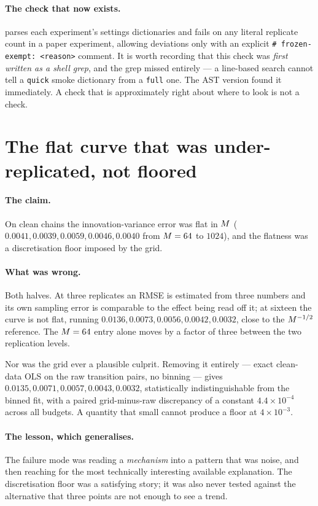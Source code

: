 \paragraph{The check that now exists.}  parses each
experiment's settings dictionaries and fails on any literal replicate count in a paper
experiment, allowing deviations only with an explicit \texttt{\# frozen-exempt: <reason>}
comment. It is worth recording that this check was \emph{first written as a shell grep}, and the
grep missed  entirely --- a line-based search cannot tell a \texttt{quick} smoke
dictionary from a \texttt{full} one. The AST version found it immediately. A check that is
approximately right about where to look is not a check.

\section{The flat curve that was under-replicated, not floored}
\label{sec:corr-flat}

\paragraph{The claim.} On clean chains the innovation-variance error was flat in $M$
($0.0041, 0.0039, 0.0059, 0.0046, 0.0040$ from $M=64$ to $1024$), and the flatness was a
discretisation floor imposed by the grid.

\paragraph{What was wrong.} Both halves. At three replicates an RMSE is estimated from three
numbers and its own sampling error is comparable to the effect being read off it; at sixteen the
curve is not flat, running $0.0136, 0.0073, 0.0056, 0.0042, 0.0032$, close to the $M^{-1/2}$
reference. The $M=64$ entry alone moves by a factor of three between the two replication
levels.

Nor was the grid ever a plausible culprit. Removing it entirely --- exact clean-data OLS on the
raw transition pairs, no binning --- gives $0.0135, 0.0071, 0.0057, 0.0043, 0.0032$, statistically
indistinguishable from the binned fit, with a paired grid-minus-raw discrepancy of a constant
$4.4\times10^{-4}$ across all budgets. A quantity that small cannot produce a floor at
$4\times10^{-3}$.

\paragraph{The lesson, which generalises.} The failure mode was reading a \emph{mechanism} into a
pattern that was noise, and then reaching for the most technically interesting available
explanation. The discretisation floor was a satisfying story; it was also never tested against
the alternative that three points are not enough to see a trend.

